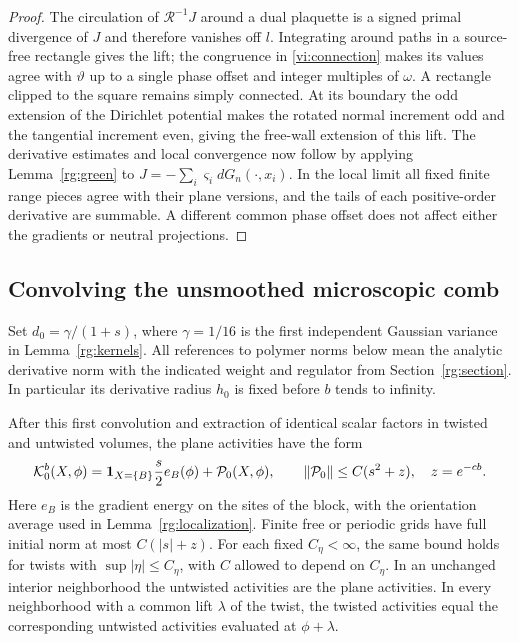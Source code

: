 \begin{proof}
The circulation of $\mathcal R^{-1}J$ around a dual plaquette is a signed
primal divergence of $J$ and therefore vanishes off $l$.  Integrating
around paths in a source-free rectangle gives the lift; the congruence in
\eqref{vi:connection} makes its values agree with $\vartheta$ up to a
single phase offset and integer multiples of $\omega$.  A rectangle
clipped to the square remains simply connected.  At its boundary the
odd extension of the Dirichlet potential makes the rotated normal
increment odd and the tangential increment even, giving the free-wall
extension of this lift.  The derivative estimates and local convergence
now follow by applying Lemma~\ref{rg:green} to
$J=-\sum_i\varsigma_i dG_n(\cdot,x_i)$.  In the local limit all fixed
finite range pieces agree with their plane versions, and the tails of
each positive-order derivative are summable.  A different common phase
offset does not affect either the gradients or neutral projections.
\end{proof}

\subsection{Convolving the unsmoothed microscopic comb}

Set $d_0=\gamma/(1+s)$, where $\gamma=1/16$ is the first independent
Gaussian variance in Lemma~\ref{rg:kernels}.  All references to polymer
norms below mean the analytic derivative norm with the indicated weight
and regulator from Section~\ref{rg:section}.  In particular its derivative
radius $h_0$ is fixed before $b$ tends to infinity.

\begin{proposition}\label{vi:initialization}
After this first convolution and extraction of identical scalar factors
in twisted and untwisted volumes, the plane activities have the form
\begin{equation}
 \mathcal K_0^b(X,\phi)
 =\mathbf 1_{X=\{B\}}\frac s2 e_B(\phi)+\mathcal P_0(X,\phi),\qquad
 \lVert \mathcal P_0\rVert\le C(s^2+z),\quad z=e^{-cb}.
 \label{vi:initial-bulk}
\end{equation}
Here $e_B$ is the gradient energy on the sites of the block, with the
orientation average used in Lemma~\ref{rg:localization}.  Finite free or
periodic grids have full initial norm at most $C(|s|+z)$.  For each fixed
$C_\eta<\infty$, the same bound holds for twists with
$\sup|\eta|\le C_\eta$, with $C$ allowed to depend on $C_\eta$.
In an unchanged interior neighborhood the untwisted activities are the plane activities.
In every neighborhood with a common lift $\lambda$ of the twist, the
twisted activities equal the corresponding untwisted activities evaluated
at $\phi+\lambda$.
\end{proposition}

